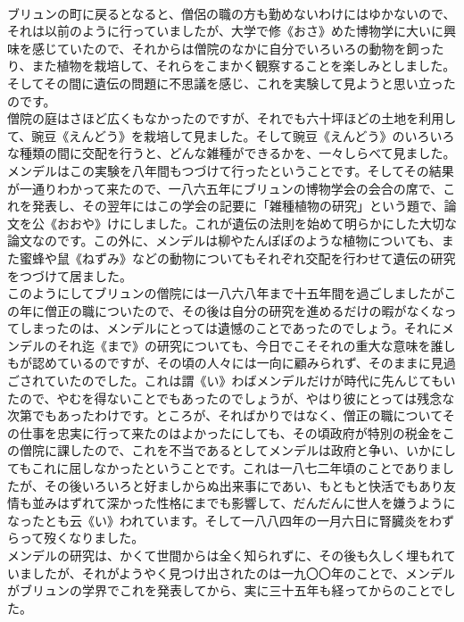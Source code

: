\documentclass[8pt]{extreport}
\begin{document}
\begin{CJK}{UTF8}{min}
\\	ブリュンの町に戻るとなると、僧侶の職の方も勤めないわけにはゆかないので、それは以前のように行っていましたが、大学で修《おさ》めた博物学に大いに興味を感じていたので、それからは僧院のなかに自分でいろいろの動物を飼ったり、また植物を栽培して、それらをこまかく観察することを楽しみとしました。そしてその間に遺伝の問題に不思議を感じ、これを実験して見ようと思い立ったのです。
\\	僧院の庭はさほど広くもなかったのですが、それでも六十坪ほどの土地を利用して、豌豆《えんどう》を栽培して見ました。そして豌豆《えんどう》のいろいろな種類の間に交配を行うと、どんな雑種ができるかを、一々しらべて見ました。メンデルはこの実験を八年間もつづけて行ったということです。そしてその結果が一通りわかって来たので、一八六五年にブリュンの博物学会の会合の席で、これを発表し、その翌年にはこの学会の記要に「雑種植物の研究」という題で、論文を公《おおや》けにしました。これが遺伝の法則を始めて明らかにした大切な論文なのです。この外に、メンデルは柳やたんぽぽのような植物についても、また蜜蜂や鼠《ねずみ》などの動物についてもそれぞれ交配を行わせて遺伝の研究をつづけて居ました。
\\	このようにしてブリュンの僧院には一八六八年まで十五年間を過ごしましたがこの年に僧正の職についたので、その後は自分の研究を進めるだけの暇がなくなってしまったのは、メンデルにとっては遺憾のことであったのでしょう。それにメンデルのそれ迄《まで》の研究についても、今日でこそそれの重大な意味を誰しもが認めているのですが、その頃の人々には一向に顧みられず、そのままに見過ごされていたのでした。これは謂《い》わばメンデルだけが時代に先んじてもいたので、やむを得ないことでもあったのでしょうが、やはり彼にとっては残念な次第でもあったわけです。ところが、そればかりではなく、僧正の職についてその仕事を忠実に行って来たのはよかったにしても、その頃政府が特別の税金をこの僧院に課したので、これを不当であるとしてメンデルは政府と争い、いかにしてもこれに屈しなかったということです。これは一八七二年頃のことでありましたが、その後いろいろと好ましからぬ出来事にであい、もともと快活でもあり友情も並みはずれて深かった性格にまでも影響して、だんだんに世人を嫌うようになったとも云《い》われています。そして一八八四年の一月六日に腎臓炎をわずらって歿くなりました。
\\	メンデルの研究は、かくて世間からは全く知られずに、その後も久しく埋もれていましたが、それがようやく見つけ出されたのは一九〇〇年のことで、メンデルがブリュンの学界でこれを発表してから、実に三十五年も経ってからのことでした。

\end{CJK}
\end{document}
